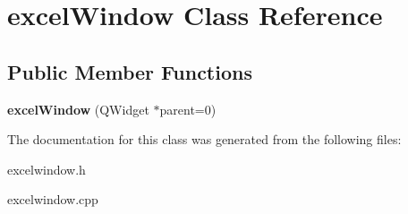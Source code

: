 \hypertarget{classexcelWindow}{\section{excel\-Window \-Class \-Reference}
\label{classexcelWindow}
}
\subsection*{\-Public \-Member \-Functions}
\begin{DoxyCompactItemize}
\item 
\hypertarget{classexcelWindow_a826064a1fc3e6426e270792f2e7b1bcc}{{\bfseries excel\-Window} (\-Q\-Widget $\ast$parent=0)}\label{classexcelWindow_a826064a1fc3e6426e270792f2e7b1bcc}

\end{DoxyCompactItemize}


\-The documentation for this class was generated from the following files\-:\begin{DoxyCompactItemize}
\item 
excelwindow.\-h\item 
excelwindow.\-cpp\end{DoxyCompactItemize}
